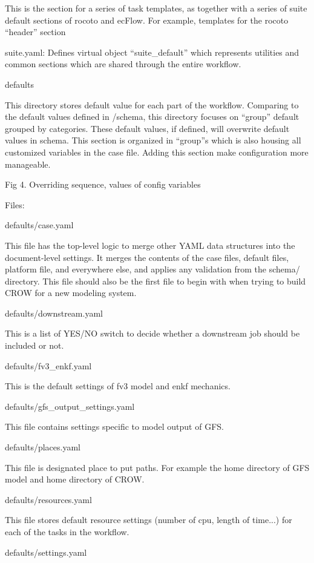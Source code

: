 This is the section for a series of task templates, as together with a series of suite default sections of rocoto and ec\-Flow. For example, templates for the rocoto “header” section

suite.\-yaml\-: Defines virtual object “suite\-\_\-default” which represents utilities and common sections which are shared through the entire workflow.

defaults

This directory stores default value for each part of the workflow. Comparing to the default values defined in /schema, this directory focuses on “group” default grouped by categories. These default values, if defined, will overwrite default values in schema. This section is organized in “group”s which is also housing all customized variables in the case file. Adding this section make configuration more manageable.

Fig 4. Overriding sequence, values of config variables

Files\-:

defaults/case.\-yaml

This file has the top-\/level logic to merge other Y\-A\-M\-L data structures into the document-\/level settings. It merges the contents of the case files, default files, platform file, and everywhere else, and applies any validation from the schema/ directory. This file should also be the first file to begin with when trying to build C\-R\-O\-W for a new modeling system.

defaults/downstream.\-yaml

This is a list of Y\-E\-S/\-N\-O switch to decide whether a downstream job should be included or not.

defaults/fv3\-\_\-enkf.\-yaml

This is the default settings of fv3 model and enkf mechanics.

defaults/gfs\-\_\-output\-\_\-settings.\-yaml

This file contains settings specific to model output of G\-F\-S.

defaults/places.\-yaml

This file is designated place to put paths. For example the home directory of G\-F\-S model and home directory of C\-R\-O\-W.

defaults/resources.\-yaml

This file stores default resource settings (number of cpu, length of time...) for each of the tasks in the workflow.

defaults/settings.\-yaml

